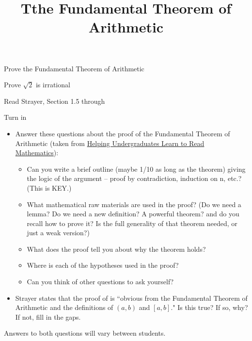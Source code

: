 \documentclass{../ximera}
\title{Tthe Fundamental Theorem of Arithmetic}
\begin{document}
\begin{abstract}
\end{abstract}
\maketitle


\begin{obj}
\item Prove the Fundamental Theorem of Arithmetic
\item  Prove $\sqrt{2}$ is irrational
\end{obj}

\begin{instructorNotes}
	\begin{pre}
		\item[Read] Strayer, Section 1.5 through 
		\item[Turn in] 
		\begin{itemize}
		   \item Answer these questions about the proof of the Fundamental Theorem of Arithmetic (taken from \href{https://maa.org/node/121566}{Helping Undergraduates Learn to Read Mathematics}):
		   
		   \begin{itemize}
			   \item Can you write a brief outline (maybe 1/10 as long as the theorem) giving the logic of the argument -- proof by contradiction, induction on n, etc.? (This is KEY.)
			   \item What mathematical raw materials are used in the proof? (Do we need a lemma? Do we need a new definition? A powerful theorem? and do you recall how to prove it? Is the full generality of that theorem needed, or just a weak version?)
			   \item What does the proof tell you about why the theorem holds?
			   \item Where is each of the hypotheses used in the proof?
			   \item Can you think of other questions to ask yourself?
		   \end{itemize}
	   
	   \item Strayer states that the proof of  is ``obvious from the Fundamental Theorem of Arithmetic and the definitions of $(a,b)$ and $[a,b]$." Is this true? If so, why? If not, fill in the gaps.
		\end{itemize}
	   
		
	   \begin{solution}
	   Answers to both questions will vary between students.
	   \end{solution}
	   \end{pre}
\end{instructorNotes}
\end{document}
